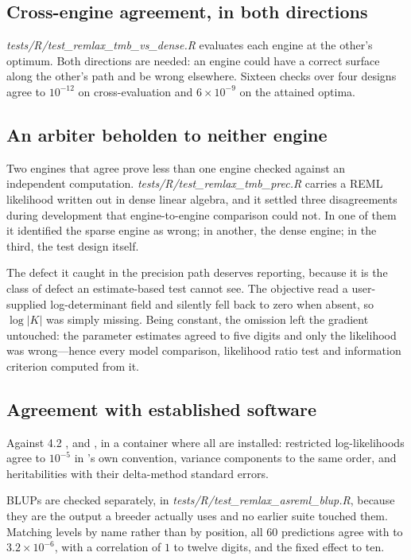 \documentclass[article]{jss}
\begin{document}
\subsection{Cross-engine agreement, in both directions}

\emph{tests/R/test\_remlax\_tmb\_vs\_dense.R} evaluates each engine at the
other's optimum. Both directions are needed: an engine could have a correct
surface along the other's path and be wrong elsewhere. Sixteen checks over
four designs agree to $10^{-12}$ on cross-evaluation and $6 \times 10^{-9}$ on
the attained optima.

\subsection{An arbiter beholden to neither engine}

Two engines that agree prove less than one engine checked against an
independent computation. \emph{tests/R/test\_remlax\_tmb\_prec.R} carries a
REML likelihood written out in dense linear algebra, and it settled three
disagreements during development that engine-to-engine comparison could not.
In one of them it identified the sparse engine as wrong; in another, the dense
engine; in the third, the test design itself.

The defect it caught in the precision path deserves reporting, because it is
the class of defect an estimate-based test cannot see. The objective read a
user-supplied log-determinant field and silently fell back to zero when
absent, so $\log|K|$ was simply missing. Being constant, the omission left the
gradient untouched: the parameter estimates agreed to five digits and only the
likelihood was wrong---hence every model comparison, likelihood ratio test and
information criterion computed from it.

\subsection{Agreement with established software}

Against  4.2 \citep{asreml},  \citep{lme4} and
 \citep{sommer}, in a container where all are installed:
restricted log-likelihoods agree to $10^{-5}$ in 's own
convention, variance components to the same order, and heritabilities with
their delta-method standard errors.

BLUPs are checked separately, in
\emph{tests/R/test\_remlax\_asreml\_blup.R}, because they are the output a
breeder actually uses and no earlier suite touched them. Matching levels by
name rather than by position, all $60$ predictions agree with  to
$3.2 \times 10^{-6}$, with a correlation of $1$ to twelve digits, and the
fixed effect to ten.
\end{document}
